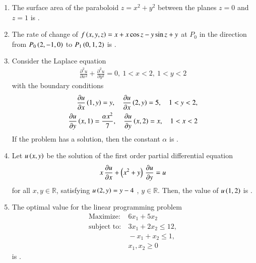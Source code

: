\documentclass[journal,12pt,onecolumn]{IEEEtran}
\theoremstyle{remark}
\begin{document}
\begin{enumerate}
\hfill{}

\item The surface area of the paraboloid $z = x^2 + y^2$ between the planes $z = 0$ and $z = 1$ is \underline{\hspace{2cm}} .

\hfill{}

\item The rate of change of $f\left(x, y, z\right) = x + x \cos z - y \sin z + y$ at $P_0$ in the direction from $P_0\left(2, -1, 0\right)$ to $P_1\left(0, 1, 2\right)$ is \underline{\hspace{2cm}}.

\hfill{}

\item Consider the Laplace equation
\begin{align*}
\frac{\partial^{2} u}{\partial x^{2}} + \frac{\partial^{2} u}{\partial y^{2}} = 0,\  1 < x < 2,\  1 < y < 2
\end{align*}
with the boundary conditions
\begin{align*}
\frac{\partial u}{\partial x}\left(1, y\right) = y,\quad
\frac{\partial u}{\partial x}\left(2, y\right) = 5,\quad 1 < y < 2,\\
\frac{\partial u}{\partial y}\left(x, 1\right) = \frac{\alpha x^{2}}{7},\quad
\frac{\partial u}{\partial y}\left(x, 2\right) = x,\quad 1 < x < 2
\end{align*}
If the problem has a solution, then the constant $\alpha$ is \underline{\hspace{2cm}}.

\hfill{}

\item Let $u\left(x,y\right)$ be the solution of the first order partial differential equation
\begin{align*}
x\,\frac{\partial u}{\partial x} + \left(x^2 + y\right)\,\frac{\partial u}{\partial y} = u
\end{align*}
for all $x,y \in \mathbb{R}$, satisfying $u\left(2,y\right) = y - 4$ , $y \in \mathbb{R}$. Then, the value of $u\left(1,2\right)$ is \underline{\hspace{2cm}}.

\hfill{}

\item The optimal value for the linear programming problem
\begin{align*}
\text{Maximize} \colon &\ 6 x_1 + 5 x_2\\
\text{subject to} \colon &\ 3 x_1 + 2 x_2 \le 12,\\
&\ - x_1 + x_2 \le 1,\\
&\ x_1, x_2 \ge 0
\end{align*}
is \underline{\hspace{2cm}}.


\end{enumerate}
\end{document}
